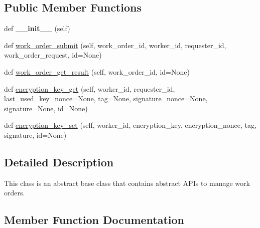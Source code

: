 \subsection*{Public Member Functions}
\begin{DoxyCompactItemize}
\item 
\mbox{\label{classavalon__sdk_1_1connector_1_1interfaces_1_1work__order_1_1WorkOrder_ab0092a12db179b1a6fb9382ffbf79539}} 
def {\bfseries \+\_\+\+\_\+init\+\_\+\+\_\+} (self)
\item 
def \hyperlink{classavalon__sdk_1_1connector_1_1interfaces_1_1work__order_1_1WorkOrder_aea6e59d06a08e5ab0c3fdea6650fd453}{work\+\_\+order\+\_\+submit} (self, work\+\_\+order\+\_\+id, worker\+\_\+id, requester\+\_\+id, work\+\_\+order\+\_\+request, id=None)
\item 
def \hyperlink{classavalon__sdk_1_1connector_1_1interfaces_1_1work__order_1_1WorkOrder_ad7a0339a6048e7c2d91792a5cf293a3e}{work\+\_\+order\+\_\+get\+\_\+result} (self, work\+\_\+order\+\_\+id, id=None)
\item 
def \hyperlink{classavalon__sdk_1_1connector_1_1interfaces_1_1work__order_1_1WorkOrder_ad4d58707bfa32df53e0dbb19083b31f9}{encryption\+\_\+key\+\_\+get} (self, worker\+\_\+id, requester\+\_\+id, last\+\_\+used\+\_\+key\+\_\+nonce=None, tag=None, signature\+\_\+nonce=None, signature=None, id=None)
\item 
def \hyperlink{classavalon__sdk_1_1connector_1_1interfaces_1_1work__order_1_1WorkOrder_a3a5014cbe6b89cce35d11fade8cb94b1}{encryption\+\_\+key\+\_\+set} (self, worker\+\_\+id, encryption\+\_\+key, encryption\+\_\+nonce, tag, signature, id=None)
\end{DoxyCompactItemize}


\subsection{Detailed Description}
\begin{DoxyVerb}This class is an abstract base class that contains
abstract APIs to manage work orders.
\end{DoxyVerb}
 

\subsection{Member Function Documentation}
\mbox{\label{classavalon__sdk_1_1connector_1_1interfaces_1_1work__order_1_1WorkOrder_ad4d58707bfa32df53e0dbb19083b31f9}} 
